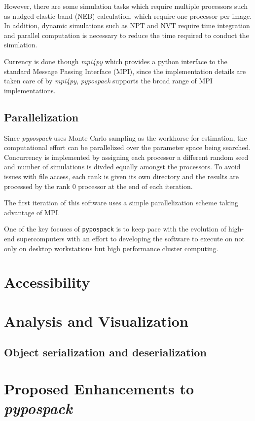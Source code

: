 However, there are some simulation tasks which require multiple processors such as nudged elastic band (NEB) calculation, which require one processor per image.  In addition, dynamic simulations such as NPT and NVT require time integration and parallel computation is necessary to reduce the time required to conduct the simulation.


Currency is done though \emph{mpi4py} which provides a python interface to the standard Message Passing Interface (MPI), since the implementation details are taken care of by \emph{mpi4py}, \emph{pypospack} supports the broad range of MPI implementations.

\subsection{Parallelization}



Since \emph{pypospack} uses Monte Carlo sampling as the workhorse for estimation, the computational effort can be parallelized over the parameter space being searched.  Concurrency is implemented by assigning each processor a different random seed and number of simulations is divded equally amongst the processors.  To avoid issues with file access, each rank is given its own directory and the results are processed by the rank $0$ processor at the end of each iteration.

The first iteration of this software uses a simple parallelization scheme taking advantage of MPI.

One of the key focuses of \verb|pypospack| is to keep pace with the evolution of high-end supercomputers with an effort to developing the software to execute on not only on desktop workstations but high performance cluster computing.
\section{Accessibility}
\label{sec:softwre_acessibility}

\section{Analysis and Visualization}
\label{sec:software_analysis}
\subsection{Object serialization and deserialization}



\section{Proposed Enhancements to \emph{pypospack}}
